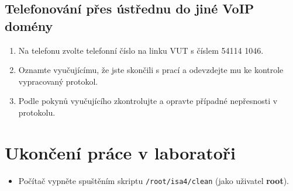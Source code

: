 \subsection{Telefonování přes ústřednu do jiné VoIP domény}
\begin{enumerate}
    \item Na telefonu zvolte telefonní číslo na linku VUT s číslem 54114 1046.
    \item Oznamte vyučujícímu, že jste skončili s prací a odevzdejte mu ke kontrole vypracovaný protokol. 
    \item Podle pokynů vyučujícího zkontrolujte a opravte případné nepřesnosti v protokolu. 
\end{enumerate}

\section{Ukončení práce v laboratoři}
\begin{itemize}
  \item Počítač vypněte spuštěním skriptu {\tt /root/isa4/clean} (jako uživatel {\bf root}).
\end{itemize}

